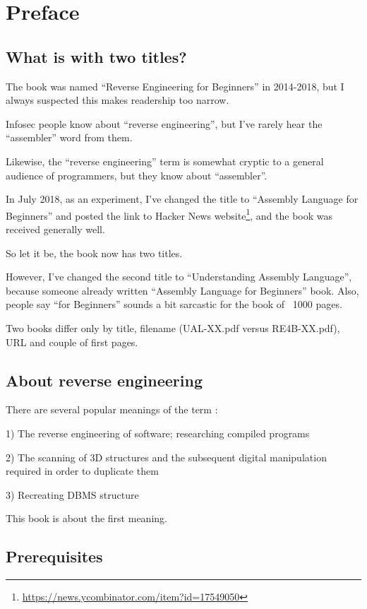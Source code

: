 \section*{Preface}

\subsection*{What is with two titles?}
\label{TwoTitles}

The book was named ``Reverse Engineering for Beginners'' in 2014-2018, but I always suspected this makes readership too narrow.

Infosec people know about ``reverse engineering'', but I've rarely hear the ``assembler'' word from them.

Likewise, the ``reverse engineering'' term is somewhat cryptic to a general audience of programmers, but they know about ``assembler''.

In July 2018, as an experiment, I've changed the title to ``Assembly Language for Beginners''
and posted the link to Hacker News website\footnote{\url{https://news.ycombinator.com/item?id=17549050}}, and the book was received generally well.

So let it be, the book now has two titles.

However, I've changed the second title to ``Understanding Assembly Language'', because someone already written ``Assembly Language for Beginners'' book.
Also, people say ``for Beginners'' sounds a bit sarcastic for the book of ~1000 pages.

Two books differ only by title, filename (UAL-XX.pdf versus RE4B-XX.pdf), URL and couple of first pages.

\subsection*{About reverse engineering}

There are several popular meanings of the term :

1) The reverse engineering of software; researching compiled programs

2) The scanning of 3D structures and the subsequent digital manipulation required in order to duplicate them

3) Recreating \ac{DBMS} structure

This book is about the first meaning.

\subsection*{Prerequisites}

